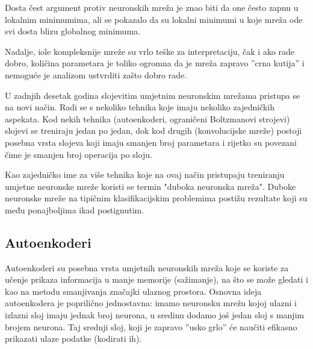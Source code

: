 \documentclass[times, utf8, diplomski, numeric]{fer}
\begin{document}
Dosta čest argument protiv neuronskih mreža je znao biti da one često zapnu u lokalnim minimumima, ali se pokazalo da su lokalni minimumi u koje mreža ode svi dosta blizu globalnog minimuma. \cite{choromanska14}

Nadalje, iole kompleksnije mreže su vrlo teške za interpretaciju, čak i ako rade dobro, količina parametara je toliko ogromna da je mreža zapravo ''crna kutija'' i nemoguće je analizom ustvrditi zašto dobro rade.

U zadnjih desetak godina slojevitim umjetnim neuronskim mrežama pristupa se na novi način. Radi se s nekoliko tehnika koje imaju nekoliko zajedničkih aspekata.
Kod nekih tehnika (autoenkoderi, ograničeni Boltzmanovi strojevi) slojevi se treniraju jedan po jedan, dok kod drugih (konvolucijske mreže) postoji posebna vrsta slojeva koji imaju smanjen broj parametara i rijetko su povezani čime je smanjen broj operacija po sloju.

Kao zajedničko ime za više tehnika koje na ovaj način pristupaju treniranju umjetne neuronske mreže koristi se termin "duboka neuronska mreža". Duboke neuronske mreže na tipičnim klasifikacijskim problemima postižu rezultate koji su među ponajboljima ikad postignutim.

\subsection{Autoenkoderi}

Autoenkoderi su posebna vrsta umjetnih neuronskih mreža koje se koriste za učenje prikaza informacija u manje memorije (sažimanje), na što se može gledati i kao na metodu smanjivanja značajki ulaznog prostora.
Osnovna ideja autoenkodera je poprilično jednostavna: imamo neuronsku mrežu kojoj ulazni i izlazni sloj imaju jednak broj neurona, u sredinu dodamo još jedan sloj s manjim brojem neurona. Taj srednji sloj, koji je zapravo ''usko grlo'' će naučiti efikasno prikazati ulaze podatke (kodirati ih).
\end{document}
